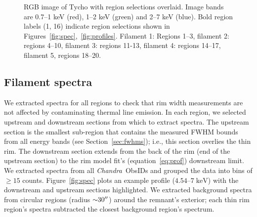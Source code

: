 \documentclass[iop, apj, numberedappendix]{emulateapj}
\newcommand*{\mt}{\mathrm}
\newcommand*{\unit}[1]{\;\mt{#1}}  %
\newcommand*{\abt}{\mathord{\sim}} %
\newcommand*{\Chandra}{\textit{Chandra}\ }
\begin{document}
\begin{figure}
    \centering
    \caption{RGB image of Tycho with region selections overlaid.  Image bands
    are 0.7--1 keV (red), 1--2 keV (green) and 2--7 keV (blue).  Bold region
    labels (1, 16) indicate region selections shown in
    Figures~\ref{fig:spec},~\ref{fig:profiles}.  Filament 1: Regions 1--3,
    filament 2: regions 4--10, filament 3: regions 11-13, filament 4:
    regions 14--17, filament 5, regions 18--20.
    \label{fig:snr}}
\end{figure}

\subsection{Filament spectra}
\label{sec:spec}

We extracted spectra for all regions to check that rim width measurements are
not affected by contaminating thermal line emission.  In each region, we
selected upstream and downstream sections from which to extract spectra.  The
upstream section is the smallest sub-region that contains the measured FWHM
bounds from all energy bands (see Section~\ref{sec:fwhms}); i.e., this section
overlies the thin rim.  The downstream section extends from the back of the rim
(end of the upstream section) to the rim model fit's (equation~\eqref{eq:prof})
downstream limit.  We extracted spectra from all \Chandra ObsIDs and grouped
the data into bins of $\geq 15$ counts.  Figure~\ref{fig:spec} plots an example
profile ($4.54$--$7 \unit{keV}$) with the downstream and upstream sections
highlighted.  We extracted background spectra from circular regions (radius
$\abt 30\arcsec$) around the remnant's exterior; each thin rim region's spectra
subtracted the closest background region's spectrum.

\begin{figure*}
    \caption{Spectra and fits from Regions 1 (top) and 16 (bottom) show varying
    rim morphology and example of rim where 0.7--1 keV peak could not be fit.
    Left: $4.5$--$7 \unit{keV}$ profile with highlighted downstream (blue) and
    upstream (grey) sections.  Intensity in arbitrary units (a.u.).  Middle:
    downstream spectrum with absorbed power law fit; Si and S lines at $1.85$,
    $2.45 \unit{keV}$ are clearly visible.  Right: upstream spectrum with
    absorbed power law fit shows that each region is likely free of thermal
    line
emission.}
    \label{fig:spec}
\end{figure*}
\end{document}
